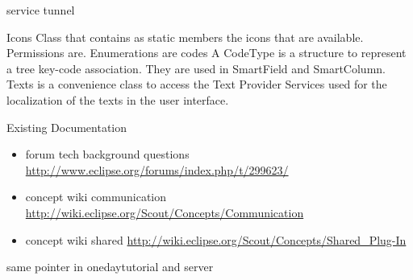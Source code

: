 \documentclass[a4paper,10pt,twoside]{book}
\begin{document}
service tunnel

Icons Class that contains as static members the icons that are available. 
Permissions are.
Enumerations are codes A CodeType is a structure to represent a tree key-code association. 
They are used in SmartField and SmartColumn. 
Texts is a convenience class to access the Text Provider Services used for the localization of the texts in the user interface. 


\noindent Existing Documentation
\begin{itemize}
  \item forum tech background questions \url{http://www.eclipse.org/forums/index.php/t/299623/}
  \item concept wiki communication \url{http://wiki.eclipse.org/Scout/Concepts/Communication}
  \item concept wiki shared \url{http://wiki.eclipse.org/Scout/Concepts/Shared_Plug-In}
\end{itemize}

same pointer in onedaytutorial and server


\ifx\wholebook\relax\else
   
   
\end{document}
